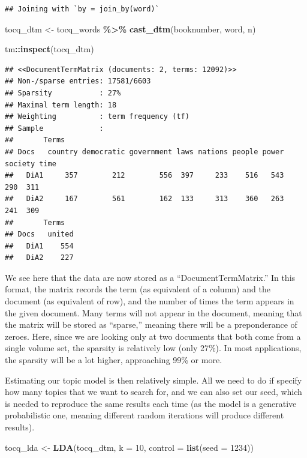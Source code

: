 \documentclass[
]{article}
\newenvironment{Shaded}{\begin{snugshade}}{\end{snugshade}}
\newcommand{\AttributeTok}[1]{\textcolor[rgb]{0.13,0.29,0.53}{#1}}
\newcommand{\DecValTok}[1]{\textcolor[rgb]{0.00,0.00,0.81}{#1}}
\newcommand{\FunctionTok}[1]{\textcolor[rgb]{0.13,0.29,0.53}{\textbf{#1}}}
\newcommand{\NormalTok}[1]{#1}
\newcommand{\OtherTok}[1]{\textcolor[rgb]{0.56,0.35,0.01}{#1}}
\newcommand{\SpecialCharTok}[1]{\textcolor[rgb]{0.81,0.36,0.00}{\textbf{#1}}}
\begin{document}
\begin{verbatim}
## Joining with `by = join_by(word)`
\end{verbatim}

\begin{Shaded}
\begin{Highlighting}[]
\NormalTok{tocq\_dtm }\OtherTok{\textless{}{-}}\NormalTok{ tocq\_words }\SpecialCharTok{\%\textgreater{}\%}
  \FunctionTok{cast\_dtm}\NormalTok{(booknumber, word, n)}

\NormalTok{tm}\SpecialCharTok{::}\FunctionTok{inspect}\NormalTok{(tocq\_dtm)}
\end{Highlighting}
\end{Shaded}

\begin{verbatim}
## <<DocumentTermMatrix (documents: 2, terms: 12092)>>
## Non-/sparse entries: 17581/6603
## Sparsity           : 27%
## Maximal term length: 18
## Weighting          : term frequency (tf)
## Sample             :
##       Terms
## Docs   country democratic government laws nations people power society time
##   DiA1     357        212        556  397     233    516   543     290  311
##   DiA2     167        561        162  133     313    360   263     241  309
##       Terms
## Docs   united
##   DiA1    554
##   DiA2    227
\end{verbatim}

We see here that the data are now stored as a ``DocumentTermMatrix.'' In
this format, the matrix records the term (as equivalent of a column) and
the document (as equivalent of row), and the number of times the term
appears in the given document. Many terms will not appear in the
document, meaning that the matrix will be stored as ``sparse,'' meaning
there will be a preponderance of zeroes. Here, since we are looking only
at two documents that both come from a single volume set, the sparsity
is relatively low (only 27\%). In most applications, the sparsity will
be a lot higher, approaching 99\% or more.

Estimating our topic model is then relatively simple. All we need to do
if specify how many topics that we want to search for, and we can also
set our seed, which is needed to reproduce the same results each time
(as the model is a generative probabilistic one, meaning different
random iterations will produce different results).

\begin{Shaded}
\begin{Highlighting}[]
\NormalTok{tocq\_lda }\OtherTok{\textless{}{-}} \FunctionTok{LDA}\NormalTok{(tocq\_dtm, }\AttributeTok{k =} \DecValTok{10}\NormalTok{, }\AttributeTok{control =} \FunctionTok{list}\NormalTok{(}\AttributeTok{seed =} \DecValTok{1234}\NormalTok{))}
\end{Highlighting}
\end{Shaded}
\end{document}

